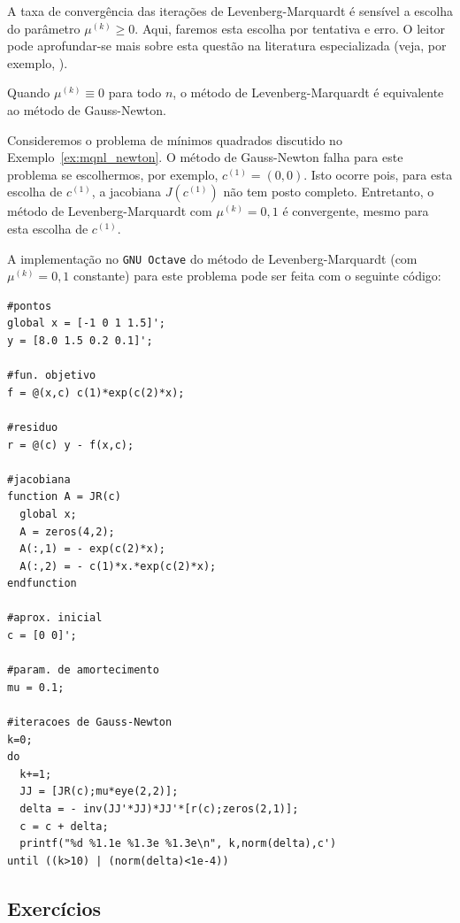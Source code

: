 A taxa de convergência das iterações de Levenberg-Marquardt é sensível a escolha do parâmetro $\mu^{(k)}\geq 0$. Aqui, faremos esta escolha por tentativa e erro. O leitor pode aprofundar-se mais sobre esta questão na literatura especializada (veja, por exemplo, \cite{Bjorck1996a,Nocedal2006a}).

\begin{obs}
  Quando $\mu^{(k)} \equiv 0$ para todo $n$, o método de Levenberg-Marquardt é equivalente ao método de Gauss-Newton.
\end{obs}

\begin{ex}\label{ex:mqnl_LM}
  Consideremos o problema de mínimos quadrados discutido no Exemplo~\ref{ex:mqnl_newton}. O método de Gauss-Newton falha para este problema se escolhermos, por exemplo, $c^{(1)} = (0, 0)$. Isto ocorre pois, para esta escolha de $c^{(1)}$, a jacobiana $J(c^{(1)})$ não tem posto completo. Entretanto, o método de Levenberg-Marquardt com $\mu^{(k)} = 0,1$ é convergente, mesmo para esta escolha de $c^{(1)}$.

\ifisoctave
A implementação no \verb+GNU Octave+ do método de Levenberg-Marquardt (com $\mu^{(k)}=0,1$ constante) para este problema pode ser feita com o seguinte código:
\begin{verbatim}
#pontos
global x = [-1 0 1 1.5]';
y = [8.0 1.5 0.2 0.1]';

#fun. objetivo
f = @(x,c) c(1)*exp(c(2)*x);

#residuo
r = @(c) y - f(x,c);

#jacobiana
function A = JR(c)
  global x;
  A = zeros(4,2);
  A(:,1) = - exp(c(2)*x);
  A(:,2) = - c(1)*x.*exp(c(2)*x);
endfunction

#aprox. inicial
c = [0 0]';

#param. de amortecimento
mu = 0.1;

#iteracoes de Gauss-Newton
k=0;
do
  k+=1;
  JJ = [JR(c);mu*eye(2,2)];
  delta = - inv(JJ'*JJ)*JJ'*[r(c);zeros(2,1)];
  c = c + delta;
  printf("%d %1.1e %1.3e %1.3e\n", k,norm(delta),c')
until ((k>10) | (norm(delta)<1e-4))
\end{verbatim}
\fi
\end{ex}

\subsection*{Exercícios}

